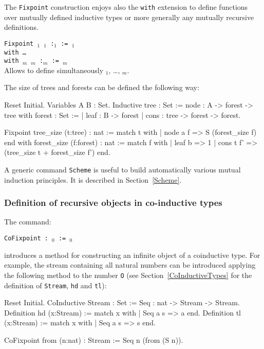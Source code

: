 The {\tt Fixpoint} construction enjoys also the {\tt with} extension
to define functions over mutually defined inductive types or more
generally any mutually recursive definitions.

\begin{Variants}
\item {\tt Fixpoint {\ident$_1$} {\params$_1$} :{\type$_1$} := {\term$_1$}\\
        with {\ldots} \\
        with {\ident$_m$} {\params$_m$} :{\type$_m$} :=  {\type$_m$}}\\
        Allows to define simultaneously {\ident$_1$}, {\ldots},
        {\ident$_m$}.
\end{Variants}

\Example 
The size of trees and forests can be defined the following way: 
\begin{coq_eval}
Reset Initial.
Variables A B : Set.
Inductive tree : Set :=
    node : A -> forest -> tree
with forest : Set :=
  | leaf : B -> forest
  | cons : tree -> forest -> forest.
\end{coq_eval}
\begin{coq_example*}
Fixpoint tree_size (t:tree) : nat :=
  match t with
  | node a f => S (forest_size f)
  end
 with forest_size (f:forest) : nat :=
  match f with
  | leaf b => 1
  | cons t f' => (tree_size t + forest_size f')
  end.
\end{coq_example*}
A generic command {\tt Scheme} is useful to build automatically various
mutual induction principles. It is described in Section~\ref{Scheme}.

\subsubsection{Definition of recursive objects in co-inductive types}

The command:
\begin{center}
  \texttt{CoFixpoint {\ident} : \type$_0$ := \term$_0$}
  \label{CoFixpoint}
\end{center}
introduces a method for constructing an infinite object of a
coinduc\-tive type. For example, the stream containing all natural
numbers can be introduced applying the following method to the number
\texttt{O} (see Section~\ref{CoInductiveTypes} for the definition of
{\tt Stream}, {\tt hd} and {\tt tl}):
\begin{coq_eval}
Reset Initial.
CoInductive Stream : Set :=
    Seq : nat -> Stream -> Stream.
Definition hd (x:Stream) := match x with
                            | Seq a s => a
                            end.
Definition tl (x:Stream) := match x with
                            | Seq a s => s
                            end.
\end{coq_eval}
\begin{coq_example}
CoFixpoint from (n:nat) : Stream := Seq n (from (S n)).
\end{coq_example}

